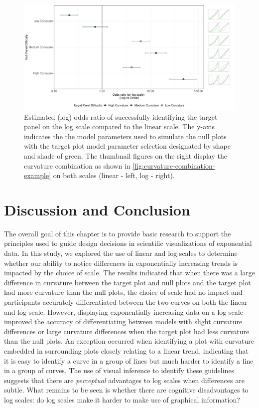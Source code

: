 \documentclass[print]{nuthesis}
\begin{document}
\begin{figure}[tbp]

{\centering \includegraphics[width=\linewidth,]{thesis_files/figure-latex/odds-ratio-plot-1} 

}

\caption[Lineups log(odds) results]{Estimated (log) odds ratio of successfully identifying the target panel on the log scale compared to the linear scale. The y-axis indicates the the model parameters used to simulate the null plots with the target plot model parameter selection designated by shape and shade of green. The thumbnail figures on the right display the curvature combination as shown in \cref{fig:curvature-combination-example} on both scales (linear - left, log - right).}\label{fig:odds-ratio-plot}
\end{figure}

\hypertarget{discussion-and-conclusion}{%
\section{Discussion and Conclusion}\label{discussion-and-conclusion}}

The overall goal of this chapter is to provide basic research to support the principles used to guide design decisions in scientific visualizations of exponential data.
In this study, we explored the use of linear and log scales to determine whether our ability to notice differences in exponentially increasing trends is impacted by the choice of scale.
The results indicated that when there was a large difference in curvature between the target plot and null plots and the target plot had more curvature than the null plots, the choice of scale had no impact and participants accurately differentiated between the two curves on both the linear and log scale.
However, displaying exponentially increasing data on a log scale improved the accuracy of differentiating between models with slight curvature differences or large curvature differences when the target plot had less curvature than the null plots.
An exception occurred when identifying a plot with curvature embedded in surrounding plots closely relating to a linear trend, indicating that it is easy to identify a curve in a group of lines but much harder to identify a line in a group of curves.
The use of visual inference to identify these guidelines suggests that there are \emph{perceptual} advantages to log scales when differences are subtle.
What remains to be seen is whether there are cognitive disadvantages to log scales: do log scales make it harder to make use of graphical information?
\end{document}
